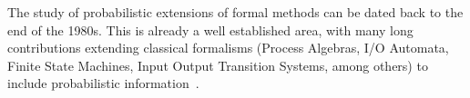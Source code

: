 The study of probabilistic extensions of formal methods can be dated back to the end of the 1980s. This is already a well established area, with many long contributions extending classical formalisms (Process Algebras, I/O Automata, Finite State Machines, Input Output Transition Systems, among others) to include probabilistic information~\cite{ls91,rgs95,cdsy99,nun03,lnr06,csv07,dghm08,hm09,hn10,dghm14,agl16}.
%
%
%		
%				
%				
